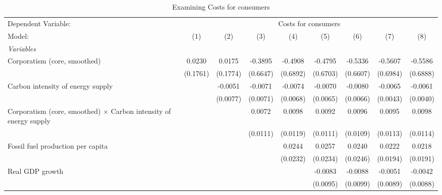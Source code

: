 
\begin{table}[htbp]
   \caption{Examining Costs for consumers}
   \centering
   \begin{tabular}{lcccccccc}
      \tabularnewline \midrule \midrule
      Dependent Variable: & \multicolumn{8}{c}{Costs for consumers}\\
      Model:                                                                   & (1)      & (2)      & (3)      & (4)      & (5)      & (6)      & (7)      & (8)\\  
      \midrule
      \emph{Variables}\\
      Corporatism (core, smoothed)                                             & 0.0230   & 0.0175   & -0.3895  & -0.4908  & -0.4795  & -0.5336  & -0.5607  & -0.5586\\   
                                                                               & (0.1761) & (0.1774) & (0.6647) & (0.6892) & (0.6703) & (0.6607) & (0.6984) & (0.6888)\\   
      Carbon intensity of energy supply                                        &          & -0.0051  & -0.0071  & -0.0074  & -0.0070  & -0.0080  & -0.0065  & -0.0061\\   
                                                                               &          & (0.0077) & (0.0071) & (0.0068) & (0.0065) & (0.0066) & (0.0043) & (0.0040)\\   
      Corporatism (core, smoothed) $\times$ Carbon intensity of energy supply  &          &          & 0.0072   & 0.0098   & 0.0092   & 0.0096   & 0.0095   & 0.0098\\   
                                                                               &          &          & (0.0111) & (0.0119) & (0.0111) & (0.0109) & (0.0113) & (0.0114)\\   
      Fossil fuel production per capita                                        &          &          &          & 0.0244   & 0.0257   & 0.0240   & 0.0222   & 0.0218\\   
                                                                               &          &          &          & (0.0232) & (0.0234) & (0.0246) & (0.0194) & (0.0191)\\   
      Real GDP growth                                                          &          &          &          &          & -0.0083  & -0.0088  & -0.0051  & -0.0042\\   
                                                                               &          &          &          &          & (0.0095) & (0.0099) & (0.0089) & (0.0088)\\   

\end{tabular}
\end{table}
